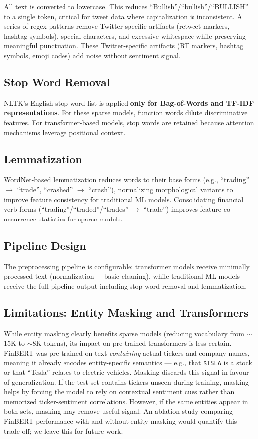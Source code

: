 \documentclass[11pt,a4paper]{article}
\begin{document}
All text is converted to lowercase. This reduces ``Bullish''/``bullish''/``BULLISH'' to a single token, critical for tweet data where capitalization is inconsistent. A series of regex patterns remove Twitter-specific artifacts (retweet markers, hashtag symbols), special characters, and excessive whitespace while preserving meaningful punctuation. These Twitter-specific artifacts (RT markers, hashtag symbols, emoji codes) add noise without sentiment signal.

\subsection{Stop Word Removal}

NLTK's English stop word list is applied \textbf{only for Bag-of-Words and TF-IDF representations}. For these sparse models, function words dilute discriminative features. For transformer-based models, stop words are retained because attention mechanisms leverage positional context.

\subsection{Lemmatization}

WordNet-based lemmatization reduces words to their base forms (e.g., ``trading'' $\rightarrow$ ``trade'', ``crashed'' $\rightarrow$ ``crash''), normalizing morphological variants to improve feature consistency for traditional ML models. Consolidating financial verb forms (``trading''/``traded''/``trades'' $\rightarrow$ ``trade'') improves feature co-occurrence statistics for sparse models.

\subsection{Pipeline Design}

The preprocessing pipeline is configurable: transformer models receive minimally processed text (normalization + basic cleaning), while traditional ML models receive the full pipeline output including stop word removal and lemmatization.

\subsection{Limitations: Entity Masking and Transformers}

While entity masking clearly benefits sparse models (reducing vocabulary from $\sim$15K to $\sim$8K tokens), its impact on pre-trained transformers is less certain. FinBERT was pre-trained on text \textit{containing} actual tickers and company names, meaning it already encodes entity-specific semantics --- e.g., that \texttt{\$TSLA} is a stock or that ``Tesla'' relates to electric vehicles. Masking discards this signal in favour of generalization. If the test set contains tickers unseen during training, masking helps by forcing the model to rely on contextual sentiment cues rather than memorized ticker-sentiment correlations. However, if the same entities appear in both sets, masking may remove useful signal. An ablation study comparing FinBERT performance with and without entity masking would quantify this trade-off; we leave this for future work.
\end{document}
